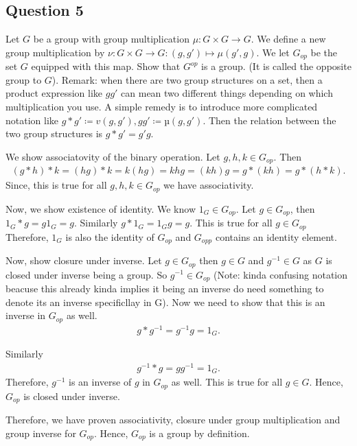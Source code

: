 \subsection{Question 5}
Let \( G \) be a group with group multiplication \( \mu : G \times  G \to  G\). We define a 
new group multiplication by \( \nu : G \times G \to G : \left( g,g' \right) \mapsto \mu \left( g', g \right)\). We let \( G_{op} \) be the set \( G \) equipped with this map.
Show that \( G^{op}  \) is a group. (It is called the opposite group to \( G \)). Remark:
when there are two group structures on a set, then a product expression like \( gg'  \) can mean two
different things depending on which multiplication you use. A simple remedy is to introduce
more complicated notation like \( g  *  g' \coloneqq  v(g, g' ), gg' \coloneqq  µ(g, g' ) \). Then the relation between the
two group structures is \( g * g'  = g' g \).

\begin{solution}
We show associatovity of the binary operation. 
Let \( g, h, k \in G_{op} \). Then
\begin{align*}
  \left( g * h \right) * k = (hg) * k
  = k(hg)
  = khg
  = \left(kh  \right)g
  = g * \left(kh  \right)
  = g * \left(h * k  \right)
.\end{align*}
Since, this is true for all \( g,h,k \in G_{op}  \) we have associativity.

Now, we show existence of identity. We know \( 1_{G} \in G_{op} \). Let \( g \in G_{op} \), then 
\( 1_{G} * g = g1_{G} = g \). Similarly \( g * 1_{G} = 1_{G}g = g \). This is true for all \( g \in G_{op} \) Therefore, 
\( 1_{G} \) is also the identity of \( G_{op} \) and \( G_{opp} \) contains an identity element.


Now, show closure under inverse. Let \( g \in G_{op}  \) then \( g \in  G    \) and \( g^{-1} \in G \) as \( G \) is closed under
inverse being a group. So \( g^{-1} \in G_{op} \) (Note: kinda confusing notation beacuse this already 
kinda implies it being an inverse do need something to denote its an inverse specificllay in G). 
Now we need to show that this is an inverse in \( G_{op} \) as well.
\begin{align*}
   g * g^{-1} = g^{-1} g = 1_{G}
.\end{align*}

Similarly
\begin{align*}
   g^{-1} * g = gg^{-1} = 1_{G}
.\end{align*}
Therefore, \( g^{-1} \) is an inverse of \( g \) in \( G_{op} \) as well. This is true for all \( g \in G \).
Hence, \( G_{op} \) is closed under inverse.

Therefore, we have proven associativity, closure under group multiplication and group inverse for \( G_{op} \). 
Hence, \( G_{op} \) is a group by definition.
\end{solution}

